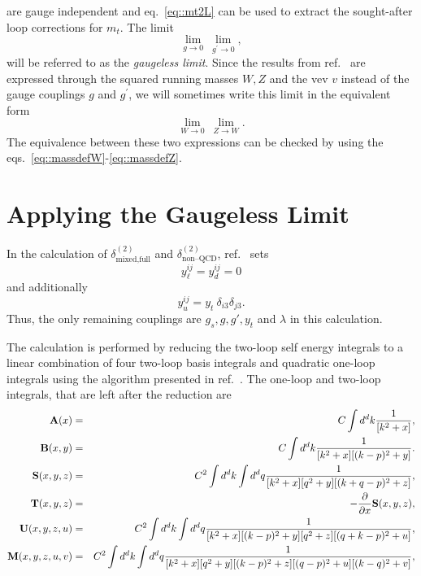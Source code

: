 \documentclass[a4paper,12pt]{book}
\begin{document}
are gauge independent and eq.\ \eqref{eq::mt2L} can be used to extract the sought-after loop corrections for $m_t$. The limit 
\begin{equation}
\lim_{g \rightarrow 0} \> \lim_{g^\prime \rightarrow 0},
\end{equation}
will be referred to as the \textit{gaugeless limit}. Since the results from ref.\ \cite{martinmain} are expressed through the squared running masses $W,Z$ and the vev $v$ instead of the gauge couplings $g$ and $g^\prime$, we will sometimes write this limit in the equivalent form 
\begin{equation}
\lim_{W \rightarrow 0} \> \lim_{Z \rightarrow W}.
\end{equation}
The equivalence between these two expressions can be checked by using the eqs.\ \eqref{eq::massdefW}-\eqref{eq::massdefZ}.
\section{Applying the Gaugeless Limit}
\label{sec::gaugelesslimit}
In the calculation of $\delta^{(2)}_\text{mixed,full}$ and $\delta^{(2)}_\text{non--QCD}$, ref.\ \cite{martinmain} sets 
\begin{equation}
y_\ell^{ij}=y_d^{ij}=0
\end{equation}
and additionally 
\begin{equation}
y_u^{ij}= y_t \> \delta_{i3} \delta_{j3}.
\end{equation}
Thus, the only remaining couplings are $g_s, g, g', y_t$ and $\lambda$ in this calculation.\par
The calculation is performed by reducing the two-loop self energy integrals to a linear combination of four two-loop basis integrals and quadratic one-loop integrals using the algorithm presented in ref.\ \cite{tarasov}. The one-loop and two-loop integrals, that are left after the reduction are
\begin{eqnarray}
\nonumber
{\bf A}(x) &=& 
C \int d^d k \frac{1}{[k^2 +x]}  ,
\label{defineboldA}
\\
\nonumber
{\bf B}(x,y) &=&
C \int d^d k   \frac{1}{[k^2 +x] [(k-p)^2 +y]}
.
\label{defineboldB}
\\
\nonumber
{\bf S}(x,y,z) &=& 
C^2\int d^d k \int d^d q  
\frac{1}{[k^2 +x] [q^2 +y] [(k+q-p)^2 +z]} ,
\label{defineboldS}
\\
\nonumber
{\bf T}(x,y,z) &=& 
-\frac{\partial}{\partial x} {\bf S}(x,y,z) ,
\label{defineboldT}
\\
\nonumber
{\bf U}(x,y,z,u) &=&
C^2 \int d^d k \int d^d q  
\frac{1}{[k^2 +x] [(k-p)^2 +y] [q^2 +z] [(q+k-p)^2 + u]} ,
\label{defineboldU}
\\
\nonumber
{\bf M}(x,y,z,u,v) &=& C^2 \int d^d k \int d^d q  
\frac{1}{[k^2 +x][q^2 + y] [(k-p)^2 +z][(q-p)^2 +u][(k-q)^2 +v]},
\label{defineboldM}
\end{eqnarray}
\end{document}
